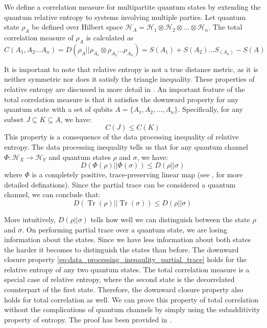 \documentclass{article}
\DeclareMathOperator{\Tr}{Tr}
\newcommand{\hilb}{\mathcal{H}}
\begin{document}
We define a correlation measure for multipartite quantum states by extending the quantum relative entropy to systems involving multiple parties. Let quantum state $\rho_A$ be defined over Hilbert space $\hilb_A = \hilb_{1} \otimes \hilb_{2} \otimes \ldots \otimes \hilb_{n}$. The total correlation measure of $\rho_A$ is calculated as 
 \begin{equation}
 \label{eq:multipartite_total_correlation}
     C(A_1, A_2 \dots A_n) = D(\rho_{A} || \rho_{A_1} \otimes \rho_{A_2} \dots \rho_{A_n}) = S(A_1) + S(A_2) \dots S_(A_n) - S(A)
 \end{equation}

It is important to note that relative entropy is not a true distance metric, as it is neither symmetric nor does it satisfy the triangle inequality. These properties of relative entropy are discussed in more detail in \cite{vedral2002relativeentropy}. An important feature of the total correlation measure is that it satisfies the downward property for any quantum state with a set of qubits $ A = \{A_1, A_2, \dots, A_n\} $. Specifically, for any subset $ J \subseteq K \subseteq A $, we have:
\begin{equation}
    \label{eq:downward_closure_total_correlation}
    C(J) \leq C(K)
\end{equation}
This property is a consequence of the data processing inequality of relative entropy. The data processing inequality tells us that for any quantum channel $ \Phi : \mathcal{H}_X \to \mathcal{H}_Y $ and quantum states $ \rho $ and $ \sigma $, we have:
\begin{equation}
\label{eq:data_processing_ineqaulity}
D(\Phi(\rho) || \Phi(\sigma)) \leq D(\rho || \sigma)
\end{equation}
where $ \Phi $ is a completely positive, trace-preserving linear map (see \cite{watrous2018theory}, \cite{dataprocessingnielsen} for more detailed definations). Since the partial trace can be considered a quantum channel, we can conclude that:
\begin{equation}
\label{eq:data_processing_ineqaulity_partial_trace}
D(\Tr(\rho) || \Tr(\sigma)) \leq D(\rho || \sigma)
\end{equation}

 More intuitively, $D(\rho || \sigma)$ tells how well we can distinguish between the state $\rho$ and $\sigma$. On performing partial trace over a quantum state, we are losing information about the states. Since we have less information about both states the harder it becomes to distinguish the states than before. The downward closure property \ref{eq:data_processing_ineqaulity_partial_trace} holds for the relative entropy of any two quantum states. The total correlation measure is a special case of relative entropy, where the second state is the decorrelated counterpart of the first state. Therefore, the downward closure property also holds for total correlation as well. We can prove this property of total correlation without the complications of quantum channels by simply using the subadditivity property of entropy. The proof has been provided in \cite{hamilton2023probing}.
\end{document}
